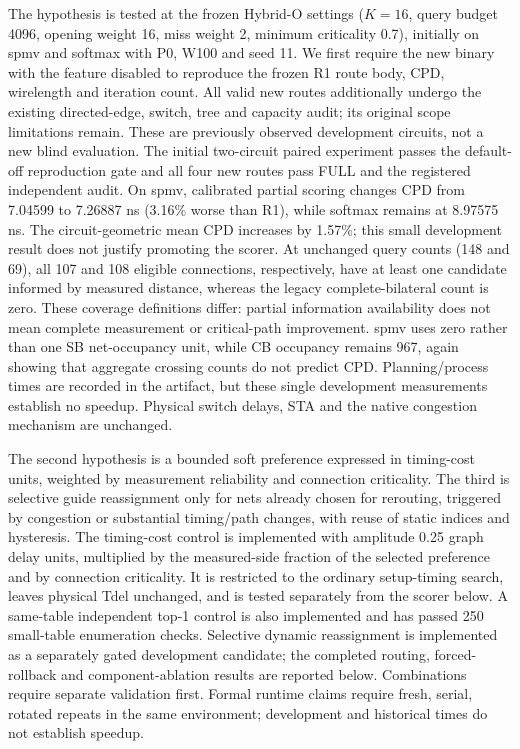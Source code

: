 \documentclass[conference,10pt]{IEEEtran}
\begin{document}
The hypothesis is tested at the frozen Hybrid-O settings ($K=16$, query budget 4096, opening weight 16, miss weight 2, minimum criticality 0.7), initially on spmv and softmax with P0, W100 and seed 11. We first require the new binary with the feature disabled to reproduce the frozen R1 route body, CPD, wirelength and iteration count. All valid new routes additionally undergo the existing directed-edge, switch, tree and capacity audit; its original scope limitations remain. These are previously observed development circuits, not a new blind evaluation. The initial two-circuit paired experiment passes the default-off reproduction gate and all four new routes pass FULL and the registered independent audit. On spmv, calibrated partial scoring changes CPD from 7.04599 to 7.26887 ns (3.16\% worse than R1), while softmax remains at 8.97575 ns. The circuit-geometric mean CPD increases by 1.57\%; this small development result does not justify promoting the scorer. At unchanged query counts (148 and 69), all 107 and 108 eligible connections, respectively, have at least one candidate informed by measured distance, whereas the legacy complete-bilateral count is zero. These coverage definitions differ: partial information availability does not mean complete measurement or critical-path improvement. spmv uses zero rather than one SB net-occupancy unit, while CB occupancy remains 967, again showing that aggregate crossing counts do not predict CPD. Planning/process times are recorded in the artifact, but these single development measurements establish no speedup. Physical switch delays, STA and the native congestion mechanism are unchanged.

The second hypothesis is a bounded soft preference expressed in timing-cost units, weighted by measurement reliability and connection criticality. The third is selective guide reassignment only for nets already chosen for rerouting, triggered by congestion or substantial timing/path changes, with reuse of static indices and hysteresis. The timing-cost control is implemented with amplitude 0.25 graph delay units, multiplied by the measured-side fraction of the selected preference and by connection criticality. It is restricted to the ordinary setup-timing search, leaves physical Tdel unchanged, and is tested separately from the scorer below. A same-table independent top-1 control is also implemented and has passed 250 small-table enumeration checks. Selective dynamic reassignment is implemented as a separately gated development candidate; the completed routing, forced-rollback and component-ablation results are reported below. Combinations require separate validation first. Formal runtime claims require fresh, serial, rotated repeats in the same environment; development and historical times do not establish speedup.
\end{document}
